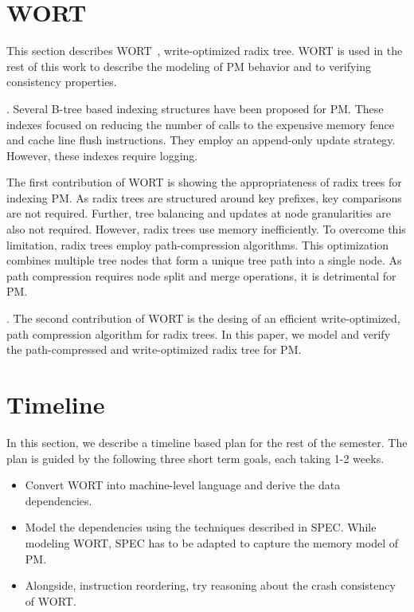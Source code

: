 \section{WORT}

This section describes WORT~\cite{201600}, write-optimized
radix tree. WORT is used in the rest of this work to describe
the modeling of PM behavior and to verifying consistency properties.

. Several B-tree based indexing structures
have been proposed for PM. These indexes focused on reducing the
number of calls to the expensive memory fence and cache line flush
instructions. They employ an append-only update strategy. However,
these indexes require logging.

The first contribution of WORT is showing the appropriateness of radix
trees for indexing PM. As radix trees are structured around key prefixes,
key comparisons are not required. Further, tree balancing and updates at
node granularities are also not required. However, radix trees use memory
inefficiently. To overcome this limitation, radix trees employ path-compression
algorithms. This optimization combines multiple tree nodes that form a unique
tree path into a single node. As path compression requires node split and
merge operations, it is detrimental for PM.

. The second contribution of WORT is
the desing of an efficient write-optimized, path compression algorithm for
radix trees. In this paper, we model and verify the path-compressed and
write-optimized radix tree for PM.

\section{Timeline}

In this section, we describe a timeline based plan for the rest of the semester.
The plan is guided by the following three short term goals, each taking 1-2 weeks.

\begin{itemize}
\item Convert WORT into machine-level language and derive the data dependencies.
\item Model the dependencies using the techniques described in SPEC. While modeling WORT,
SPEC has to be adapted to capture the memory model of PM.
\item Alongside, instruction reordering, try reasoning about the crash consistency of WORT.
\end{itemize}